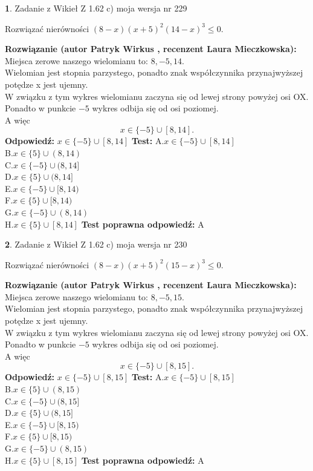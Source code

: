 \documentclass[12pt, a4paper]{article}
\theoremstyle{definition} %
\newtheorem{zad}{}
\newcommand{\zadStart}[1]{\begin{zad}#1\newline}
\newcommand{\zadStop}{\end{zad}}
\newcommand{\rozwStart}[2]{\noindent \textbf{Rozwiązanie (autor #1 , recenzent #2): }\newline}
\newcommand{\rozwStop}{\newline}
\newcommand{\odpStart}{\noindent \textbf{Odpowiedź:}\newline}
\newcommand{\odpStop}{\newline}
\newcommand{\testStart}{\noindent \textbf{Test:}\newline}
\newcommand{\testStop}{\newline}
\newcommand{\kluczStart}{\noindent \textbf{Test poprawna odpowiedź:}\newline}
\newcommand{\kluczStop}{\newline}
\begin{document}
\zadStart{Zadanie z Wikieł Z 1.62 c) moja wersja nr 229}

Rozwiązać nierówności $(8-x)(x+5)^{2}(14-x)^{3}\le0$.
\zadStop
\rozwStart{Patryk Wirkus}{Laura Mieczkowska}
Miejsca zerowe naszego wielomianu to: $8, -5, 14$.\\
Wielomian jest stopnia parzystego, ponadto znak współczynnika przy\linebreak najwyższej potędze x jest ujemny.\\ W związku z tym wykres wielomianu zaczyna się od lewej strony powyżej osi OX.\\
Ponadto w punkcie $-5$ wykres odbija się od osi poziomej.\\
A więc $$x \in \{-5\} \cup [8,14].$$
\rozwStop
\odpStart
$x \in \{-5\} \cup [8,14]$
\odpStop
\testStart
A.$x \in \{-5\} \cup [8,14]$\\
B.$x \in \{5\} \cup (8,14)$\\
C.$x \in \{-5\} \cup (8,14]$\\
D.$x \in \{5\} \cup (8,14]$\\
E.$x \in \{-5\} \cup [8,14)$\\
F.$x \in \{5\} \cup [8,14)$\\
G.$x \in \{-5\} \cup (8,14)$\\
H.$x \in \{5\} \cup [8,14]$
\testStop
\kluczStart
A
\kluczStop



\zadStart{Zadanie z Wikieł Z 1.62 c) moja wersja nr 230}

Rozwiązać nierówności $(8-x)(x+5)^{2}(15-x)^{3}\le0$.
\zadStop
\rozwStart{Patryk Wirkus}{Laura Mieczkowska}
Miejsca zerowe naszego wielomianu to: $8, -5, 15$.\\
Wielomian jest stopnia parzystego, ponadto znak współczynnika przy\linebreak najwyższej potędze x jest ujemny.\\ W związku z tym wykres wielomianu zaczyna się od lewej strony powyżej osi OX.\\
Ponadto w punkcie $-5$ wykres odbija się od osi poziomej.\\
A więc $$x \in \{-5\} \cup [8,15].$$
\rozwStop
\odpStart
$x \in \{-5\} \cup [8,15]$
\odpStop
\testStart
A.$x \in \{-5\} \cup [8,15]$\\
B.$x \in \{5\} \cup (8,15)$\\
C.$x \in \{-5\} \cup (8,15]$\\
D.$x \in \{5\} \cup (8,15]$\\
E.$x \in \{-5\} \cup [8,15)$\\
F.$x \in \{5\} \cup [8,15)$\\
G.$x \in \{-5\} \cup (8,15)$\\
H.$x \in \{5\} \cup [8,15]$
\testStop
\kluczStart
A
\kluczStop
\end{document}
